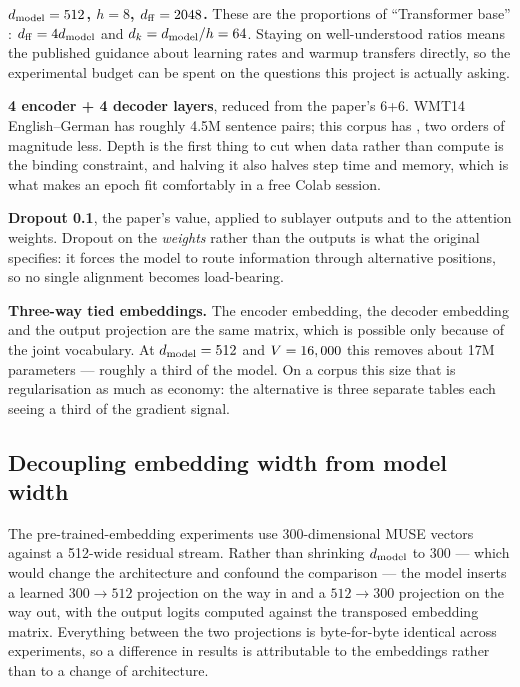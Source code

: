 \documentclass[11pt,a4paper]{article}
\begin{document}
\begin{decisionbox}
\textbf{$d_{\mathrm{model}} = 512$, $h = 8$, $d_{\mathrm{ff}} = 2048$.} These are the proportions of
``Transformer base'' \cite{vaswani2017}: $d_{\mathrm{ff}} = 4d_{\mathrm{model}}$ and $d_k =
d_{\mathrm{model}}/h = 64$. Staying on well-understood ratios means the published guidance
about learning rates and warmup transfers directly, so the experimental budget
can be spent on the questions this project is actually asking.

\textbf{4 encoder + 4 decoder layers}, reduced from the paper's 6+6. WMT14
English--German has roughly 4.5M sentence pairs; this corpus has
\PairsTrain{}, two orders of magnitude less. Depth is the first thing to cut
when data rather than compute is the binding constraint, and halving it also
halves step time and memory, which is what makes an epoch fit comfortably in a
free Colab session.

\textbf{Dropout 0.1}, the paper's value, applied to sublayer outputs and to the
attention weights. Dropout on the \emph{weights} rather than the outputs is
what the original specifies: it forces the model to route information through
alternative positions, so no single alignment becomes load-bearing.

\textbf{Three-way tied embeddings.} The encoder embedding, the decoder
embedding and the output projection are the same matrix, which is possible only
because of the joint vocabulary. At $d_{\mathrm{model}} = 512$ and $V = 16,000$
this removes about 17M parameters --- roughly a third of the model. On a corpus
this size that is regularisation as much as economy: the alternative is three
separate tables each seeing a third of the gradient signal.
\end{decisionbox}

\subsection{Decoupling embedding width from model width}

The pre-trained-embedding experiments use 300-dimensional MUSE vectors against
a 512-wide residual stream. Rather than shrinking $d_{\mathrm{model}}$ to 300 --- which
would change the architecture and confound the comparison --- the model inserts
a learned $300 \rightarrow 512$ projection on the way in and a $512 \rightarrow
300$ projection on the way out, with the output logits computed against the
transposed embedding matrix. Everything between the two projections is
byte-for-byte identical across experiments, so a difference in results is
attributable to the embeddings rather than to a change of architecture.
\end{document}
